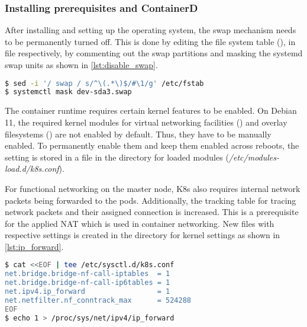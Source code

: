 \subsubsection{Installing prerequisites and ContainerD}
After installing and setting up the operating system, the swap mechanism needs to be permanently turned off. This is done by editing the file system table (), in file  respectively, by commenting out the swap partitions and masking the systemd swap units as shown in \autoref{lst:disable_swap}.

\begin{lstlisting}[label=lst:disable_swap, caption={Bash commands for disabling Swap mechanism and masking.}, language=bash]
$ sed -i '/ swap / s/^\(.*\)$/#\1/g' /etc/fstab
$ systemctl mask dev-sda3.swap
\end{lstlisting}

The container runtime requires certain kernel features to be enabled. On Debian 11, the required kernel modules for virtual networking facilities () and overlay filesystems () are not enabled by default. Thus, they have to be manually enabled.
To permanently enable them and keep them enabled across reboots, the setting is stored in a file in the directory for loaded modules (\textit{/etc/modules-load.d/k8s.conf}).
\begin{comment}
\begin{lstlisting}[label=lst:kernel_modules, caption={Bash commands for enabling required kernel modules.}, language=bash]
$ cat <<EOF | sudo tee /etc/modules-load.d/k8s.conf 
overlay 
br_netfilter 
EOF 
\end{lstlisting}
\end{comment}

For functional networking on the master node, \ac{K8s} also requires internal network packets being forwarded to the pods. Additionally, the tracking table for tracing network packets and their assigned connection is increased. This is a prerequisite for the applied \ac{NAT} which is used in container networking.
New files with respective settings is created in the directory for kernel settings as shown in \autoref{lst:ip_forward}.
\begin{lstlisting}[label=lst:ip_forward, caption={Bash commands for enabling \ac{IP} forwarding and network filtering.}, language=bash]
$ cat <<EOF | tee /etc/sysctl.d/k8s.conf 
net.bridge.bridge-nf-call-iptables  = 1
net.bridge.bridge-nf-call-ip6tables = 1
net.ipv4.ip_forward                 = 1 
net.netfilter.nf_conntrack_max      = 524288 
EOF
$ echo 1 > /proc/sys/net/ipv4/ip_forward
\end{lstlisting}


